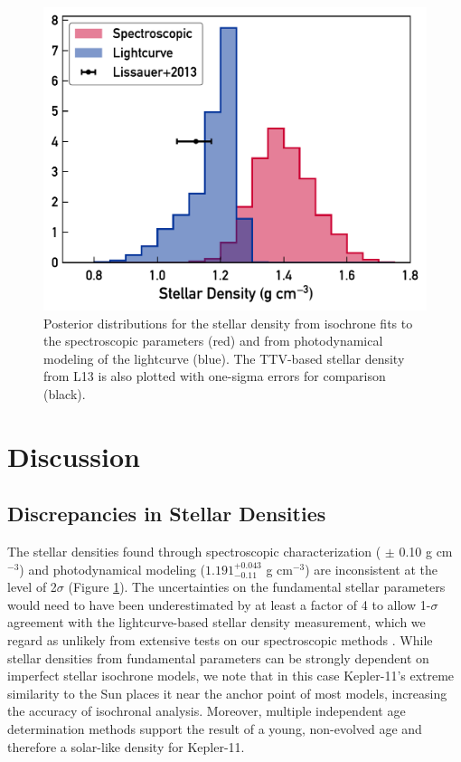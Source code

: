 \documentclass[twocolumn,trackchanges]{aastex61}
\newcommand{\gcm}{g cm$^{-3}$}
\begin{document}
\begin{figure}
\centering
\includegraphics[width=\columnwidth]{density}
\caption{Posterior distributions for the stellar density from isochrone fits to the spectroscopic parameters (red) and from photodynamical modeling of the lightcurve (blue). The TTV-based stellar density from L13 is also plotted with one-sigma errors for comparison (black).}
\label{fig:densities}
\end{figure}


\section{Discussion}
\label{s:discussion}
\subsection{Discrepancies in Stellar Densities}

The stellar densities found through spectroscopic characterization ( $\pm$ 0.10 \gcm) and photodynamical modeling ($1.191^{+0.043}_{-0.11} $ \gcm) are inconsistent at the level of \replaced{$\geq$}{$\sim$}2$\sigma$ (Figure \ref{fig:densities}). The uncertainties on the fundamental stellar parameters would need to have been underestimated by at least a factor of 4 to allow 1-$\sigma$ agreement with the lightcurve-based stellar density measurement, which we regard as unlikely from extensive tests on our spectroscopic methods \citep{Bedell2014,Ramirez2014}. While stellar densities from fundamental parameters can be strongly dependent on imperfect stellar isochrone models, we note that in this case Kepler-11's extreme similarity to the Sun places it near the anchor point of most models, increasing the accuracy of isochronal analysis. Moreover, multiple independent age determination methods support the result of a young, non-evolved age and therefore a solar-like density for Kepler-11.
\end{document}
